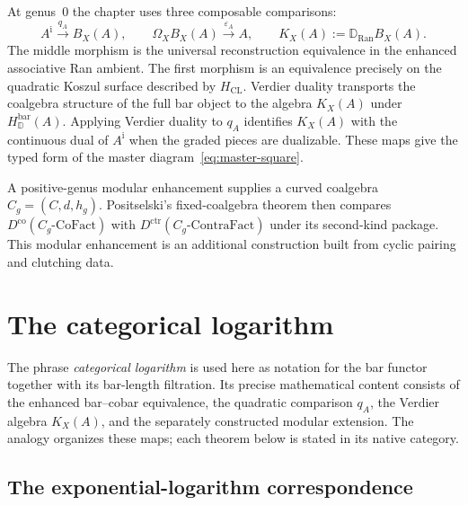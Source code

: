 \begin{remark}
\label{rem:master-diagram-genus0}
At genus~$0$ the chapter uses three composable comparisons:
\[
 A^{\mathrm i}\xrightarrow{q_A}B_X(A),
 \qquad
 \Omega_XB_X(A)\xrightarrow{\varepsilon_A}A,
 \qquad
 K_X(A):=\mathbb D_{\operatorname{Ran}}B_X(A).
\]
The middle morphism is the universal reconstruction equivalence in
the enhanced associative Ran ambient.  The first morphism is an
equivalence precisely on the quadratic Koszul surface described by
$H_{\mathrm{CL}}$.  Verdier duality transports the coalgebra structure
of the full bar object to the algebra $K_X(A)$ under
$H_{\mathbb D}^{\mathrm{bar}}(A)$.  Applying Verdier duality to $q_A$ identifies
$K_X(A)$ with the continuous dual of $A^{\mathrm i}$ when the graded
pieces are dualizable.  These maps give the typed form of the master
diagram~\eqref{eq:master-square}.

A positive-genus modular enhancement supplies a curved coalgebra
$C_g=(C,d,h_g)$.  Positselski's fixed-coalgebra theorem then compares
$D^{\mathrm{co}}(C_g\text{-}\mathrm{CoFact})$ with
$D^{\mathrm{ctr}}(C_g\text{-}\mathrm{ContraFact})$ under its
second-kind package.  This modular enhancement is an additional construction
built from cyclic pairing and clutching data.
\end{remark}

\section{The categorical logarithm}
\label{sec:categorical-logarithm}

The phrase \emph{categorical logarithm} is used here as notation for
the bar functor together with its bar-length filtration.  Its precise
mathematical content consists of the enhanced bar--cobar equivalence,
the quadratic comparison $q_A$, the Verdier algebra $K_X(A)$, and the
separately constructed modular extension.  The analogy organizes
these maps; each theorem below is stated in its native category.

\subsection{The exponential-logarithm correspondence}
\label{subsec:exp-log-correspondence}

